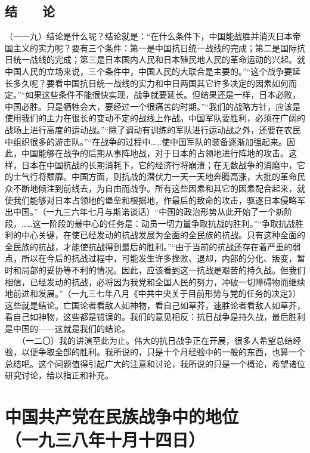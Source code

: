\documentclass[cn,11pt,chinese]{elegantbook}
\def\myformat#1{\hfil\hfil #1}
\begin{document}
\subsection*{\myformat{结　　论}}
（一一九）结论是什么呢？结论就是：“在什么条件下，中国能战胜并消灭日本帝国主义的实力呢？要有三个条件：第一是中国抗日统一战线的完成；第二是国际抗日统一战线的完成；第三是日本国内人民和日本殖民地人民的革命运动的兴起。就中国人民的立场来说，三个条件中，中国人民的大联合是主要的。”“这个战争要延长多久呢？要看中国抗日统一战线的实力和中日两国其它许多决定的因素如何而定。”“如果这些条件不能很快实现，战争就要延长。但结果还是一样，日本必败，中国必胜。只是牺牲会大，要经过一个很痛苦的时期。”“我们的战略方针，应该是使用我们的主力在很长的变动不定的战线上作战。中国军队要胜利，必须在广阔的战场上进行高度的运动战。”“除了调动有训练的军队进行运动战之外，还要在农民中组织很多的游击队。”“在战争的过程中……使中国军队的装备逐渐加强起来。因此，中国能够在战争的后期从事阵地战，对于日本的占领地进行阵地的攻击。这样，日本在中国抗战的长期消耗下，它的经济行将崩溃；在无数战争的消磨中，它的士气行将颓靡。中国方面，则抗战的潜伏力一天一天地奔腾高涨，大批的革命民众不断地倾注到前线去，为自由而战争。所有这些因素和其它的因素配合起来，就使我们能够对日本占领地的堡垒和根据地，作最后的致命的攻击，驱逐日本侵略军出中国。”（一九三六年七月与斯诺谈话）“中国的政治形势从此开始了一个新阶段，……这一阶段的最中心的任务是：动员一切力量争取抗战的胜利。”“争取抗战胜利的中心关键，在使已经发动的抗战发展为全面的全民族的抗战。只有这种全面的全民族的抗战，才能使抗战得到最后的胜利。”“由于当前的抗战还存在着严重的弱点，所以在今后的抗战过程中，可能发生许多挫败、退却，内部的分化、叛变，暂时和局部的妥协等不利的情况。因此，应该看到这一抗战是艰苦的持久战。但我们相信，已经发动的抗战，必将因为我党和全国人民的努力，冲破一切障碍物而继续地前进和发展。”（一九三七年八月《中共中央关于目前形势与党的任务的决定》）这些就是结论。亡国论者看敌人如神物，看自己如草芥，速胜论者看敌人如草芥，看自己如神物，这些都是错误的。我们的意见相反：抗日战争是持久战，最后胜利是中国的——这就是我们的结论。\\
　　（一二〇）我的讲演至此为止。伟大的抗日战争正在开展，很多人希望总结经验，以便争取全部的胜利。我所说的，只是十个月经验中的一般的东西，也算一个总结吧。这个问题值得引起广大的注意和讨论，我所说的只是一个概论，希望诸位研究讨论，给以指正和补充。\\
\newpage\section*{\myformat{中国共产党在民族战争中的地位}\\\myformat{（一九三八年十月十四日）}}
\end{document}
